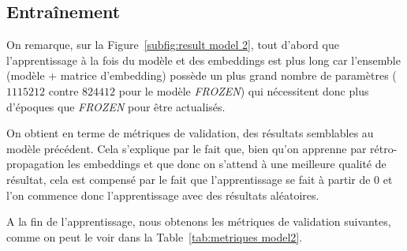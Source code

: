 \documentclass[a4paper]{article}
\begin{document}
\subsection{Entraînement}


On remarque, sur la Figure~\ref{subfig:result model 2}, tout d'abord que l'apprentissage à la fois du modèle et des embeddings est plus 
long car l'ensemble (modèle + matrice d'embedding) possède un plus grand nombre de paramètres ($1115212$ contre $824412$ pour le 
modèle \textit{FROZEN}) qui nécessitent donc plus d'époques que \textit{FROZEN} pour être actualisés.

On obtient en terme de métriques de validation, des résultats semblables au modèle précédent. Cela s'explique par le fait que, bien 
qu'on apprenne par rétro-propagation les embeddings et que donc on s'attend à une meilleure qualité de résultat, cela est compensé par 
le fait que l'apprentissage se fait à partir de 0 et l'on commence donc l'apprentissage avec des résultats aléatoires.

A la fin de l'apprentissage, nous obtenons les métriques de validation suivantes, comme on peut le voir dans la 
Table~\ref{tab:metriques model2}.
\end{document}
